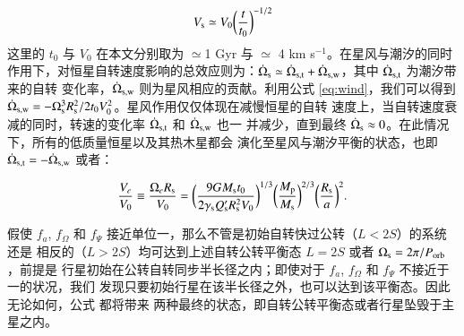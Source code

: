 \begin{equation} \label{eq:wind}
V_\mathrm{s} \simeq  V_0 \bigg( \frac{t}{t_0} \bigg)^{-1/2}
\end{equation}
这里的 $t_0$ 与 $V_0$ 在本文分别取为 $\simeq$1 Gyr 与 $\simeq$ 4 km s$^{-1}$。在星风与潮汐的同时
作用下\cite{DobbsDixon2004,Dawson2014}，对恒星自转速度影响的总效应则为：$\dot{\Omega}_\mathrm{s} 
\simeq \dot{\Omega}_\mathrm{s, t} + \dot{\Omega}_\mathrm{s, w}$，其中 $\dot{\Omega}_\mathrm{s, t}$ 为潮汐带来的自转
变化率，$\dot{\Omega}_\mathrm{s, w}$ 则为星风相应的贡献。利用公式 \ref{eq:wind}，我们可以得到 
$\dot{\Omega}_\mathrm{s, w} = -\Omega_\mathrm{s}^3 R_\mathrm{s}^2/2 t_0 V_0^2$。星风作用仅仅体现在减慢恒星的自转
速度上，当自转速度衰减的同时，转速的变化率 $ \dot{\Omega}_\mathrm{s, t}$ 和 $\dot{\Omega}_\mathrm{s, w}$ 也一
并减少，直到最终 $ \dot{\Omega}_\mathrm{s} \approx 0 $。在此情况下，所有的低质量恒星以及其热木星都会
演化至星风与潮汐平衡的状态，也即 $\dot{\Omega}_\mathrm{s, t} = - \dot{\Omega}_\mathrm{s, w}$ 或者：

\begin{equation} \label{eq:lmeq}
{V_e \over V_0} \equiv \frac{\Omega_eR_\mathrm{s}}{V_0} = \bigg( \frac{9G M_\mathrm{s}t_0}
{2 \gamma_\mathrm{s}Q_\mathrm{s}^{\prime}R_\mathrm{s}^2V_0} \bigg)^{1/3} \bigg( \frac{M_\mathrm{p}}
{M_\mathrm{s}} \bigg)^{2/3} \bigg( \frac{R_\mathrm{s}}{a} \bigg)^2.
\end{equation}  %

假使 $f_a$, $f_\Omega$ 和 $f_\Psi$ 接近单位一，那么不管是初始自转快过公转（$L<2S$）的系统还是
相反的（$L>2S$）均可达到上述自转公转平衡态 $L=2S$ 或者 $\Omega_\mathrm{s} = 2\pi /P_\mathrm{orb}$，前提是
行星初始在公转自转同步半长径之内；即使对于 $f_a$, $f_\Omega$ 和 $f_\Psi$ 不接近于一的状况，我们
发现只要初始行星在该半长径之外，也可以达到该平衡态。因此无论如何，公式 \label{eq:lmeq} 都将带来
两种最终的状态，即自转公转平衡态或者行星坠毁于主星之内。

